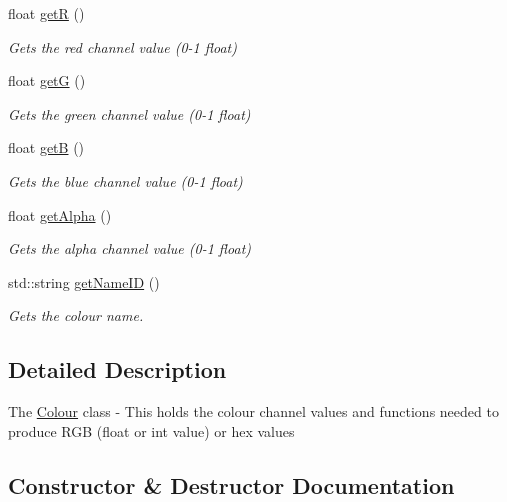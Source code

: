 \begin{DoxyCompactItemize}
float \hyperlink{classColour_a6237399e251d876aefe5d583ad251973}{getR} ()
\begin{DoxyCompactList}\small\item\em Gets the red channel value (0-\/1 float) \end{DoxyCompactList}\item 
float \hyperlink{classColour_aa16d7328c2acc3d701fd39593be50a65}{getG} ()
\begin{DoxyCompactList}\small\item\em Gets the green channel value (0-\/1 float) \end{DoxyCompactList}\item 
float \hyperlink{classColour_a9be696d70131487b8c2c4d92e09d5c8e}{getB} ()
\begin{DoxyCompactList}\small\item\em Gets the blue channel value (0-\/1 float) \end{DoxyCompactList}\item 
float \hyperlink{classColour_aa3108e4e8b6119a5e56222cd9e910219}{get\+Alpha} ()
\begin{DoxyCompactList}\small\item\em Gets the alpha channel value (0-\/1 float) \end{DoxyCompactList}\item 
std\+::string \hyperlink{classColour_a5f5329e70ac61e998658b4586ddfa753}{get\+Name\+ID} ()
\begin{DoxyCompactList}\small\item\em Gets the colour name. \end{DoxyCompactList}\end{DoxyCompactItemize}


\subsection{Detailed Description}
The \hyperlink{classColour}{Colour} class -\/ This holds the colour channel values and functions needed to produce R\+GB (float or int value) or hex values 

\subsection{Constructor \& Destructor Documentation}
\mbox{\label{classColour_a25a9ec348579c9df5363220ccbc1f3ec}} 
